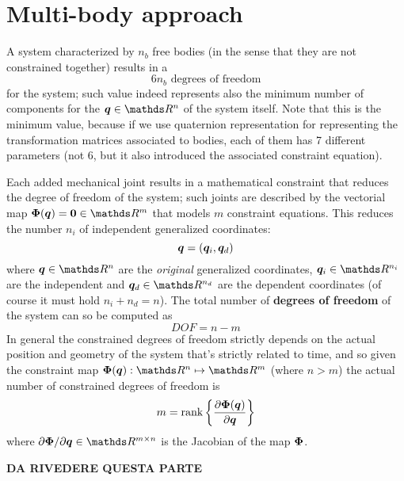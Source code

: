 \section{Multi-body approach}
	A system characterized by $n_b$ free bodies (in the sense that they are not constrained together) results in a 
	\[ 6 n_b \textrm{ degrees of freedom} \]
	for the system; such value indeed represents also the minimum number of components for the  $\vett q \in \mathds R^n$ of the system itself. Note that this is the minimum value, because if we use quaternion representation for representing the transformation matrices associated to bodies, each of them has 7 different parameters (not 6, but it also introduced the associated constraint equation).
	
	Each added mechanical joint results in a mathematical constraint that reduces the degree of freedom of the system; such joints are described by the vectorial map $\vett \Phi(\vett q) = \vett 0 \in \mathds R^m$ that models $m$ constraint equations. This reduces the number $n_i$ of independent generalized coordinates:
	\[ \boldsymbol{q} = (\boldsymbol{q}_i, \boldsymbol{q}_d) \]
	where $\vett q \in \mathds R^n$ are the \textit{original} generalized coordinates, $\vett q_i \in \mathds R^{n_i}$ are the independent and $\vett q_d\in \mathds R^{n_d}$ are the dependent coordinates (of course it must hold $n_i + n_d = n$). The total number of \textbf{degrees of freedom} of the system can so be computed as
	\[ DOF = n - m \]
	In general the constrained degrees of freedom strictly depends on the actual position and geometry of the system that's strictly related to time, and so given the constraint map $\vett \Phi(\vett q) : \mathds R^n \mapsto \mathds R^m$ (where $n>m$) the actual number of constrained degrees of freedom is
	\begin{equation}
		m = \textrm{rank}\left\{\frac{\partial \boldsymbol{\Phi}(\boldsymbol{q})}{\partial \boldsymbol{q}} \right\}
	\end{equation}
	where $\partial \vett \Phi / \partial \vett q \in \mathds R^{m\times n}$ is the Jacobian of the map $\boldsymbol{\Phi}$.
		
	\textbf{DA RIVEDERE QUESTA PARTE}
	
	
		
		
		
		
		
		
		
		
		
		
		
		
		
		
		
		
		
		
		
		
		
		
		
		
		
		
		
		